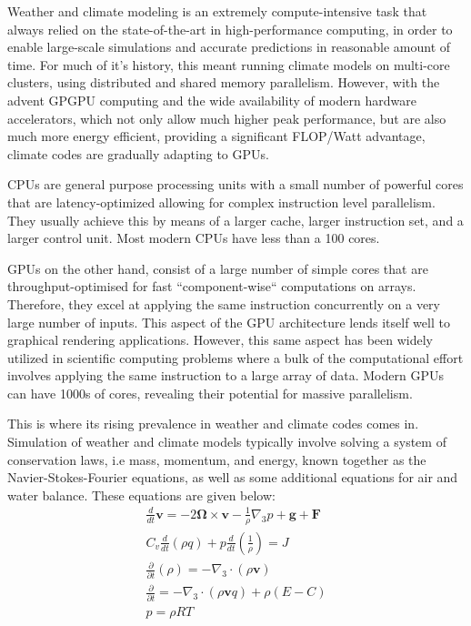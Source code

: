 
Weather and climate modeling is an extremely compute-intensive task that always relied on the state-of-the-art in high-performance computing, in order to enable large-scale simulations and accurate predictions in reasonable amount of time.
For much of it's history, this meant running climate models on multi-core clusters, using distributed and shared memory parallelism.
However, with the advent GPGPU computing and the wide availability of modern hardware accelerators, which not only allow much higher peak performance, but are also much more energy efficient, providing a significant FLOP/Watt advantage, climate codes are gradually adapting to GPUs.

CPUs are general purpose processing units with a small number of powerful cores that are latency-optimized allowing for complex instruction level parallelism.
They usually achieve this by means of a larger cache, larger instruction set, and a larger control unit.
Most modern CPUs have less than a 100 cores.

GPUs on the other hand, consist of a large number of simple cores that are throughput-optimised for fast ``component-wise`` computations on arrays.
Therefore, they excel at applying the same instruction concurrently on a very large number of inputs.
This aspect of the GPU architecture lends itself well to graphical rendering applications.
However, this same aspect has been widely utilized in scientific computing problems where a bulk of the computational effort involves applying the same instruction to a large array of data.
Modern GPUs can have 1000s of cores, revealing their potential for massive parallelism. 


This is where its rising prevalence in weather and climate codes comes in.
Simulation of weather and climate models typically involve solving a system of conservation laws, i.e mass, momentum, and energy, known together as the Navier-Stokes-Fourier equations, as well as some additional equations for air and water balance. 
These equations are given below:
\begin{subequations} 
\label{eqn:govEqn}
\begin{align}
\frac{d}{d t} \mathbf{v}=-2 \mathbf{\Omega} \times \mathbf{v}-\frac{1}{\rho} \nabla_{3} p+\mathbf{g}+\mathbf{F} \\
C_{v} \frac{d}{d t}(\rho q)+p \frac{d}{d t}\left(\frac{1}{\rho}\right)=J \\
\frac{\partial}{\partial t}(\rho)=-\nabla_{3} \cdot(\rho \mathbf{v}) \\
\frac{\partial}{\partial t}=-\nabla_{3} \cdot(\rho \mathbf{v} q)+\rho(E-C) \\
p=\rho R T
\end{align}
\end{subequations}

